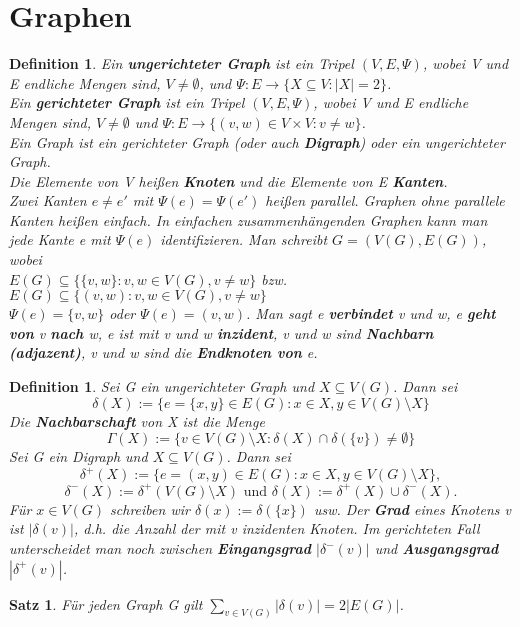 \documentclass[12pt,a4paper]{article}
\theoremstyle{plain}
\newtheorem{Satz}[Theorem]{Satz}
\newtheorem{Definition}[Theorem]{Definition}
\newcommand{\herv}[1]{{\emph{\textbf{#1}}}}
\numberwithin{equation}{section}
\begin{document}
\section{Graphen}
\begin{Definition}
Ein \herv{ungerichteter Graph} ist ein Tripel $(V,E,\Psi)$, wobei V und E endliche Mengen sind, $V\neq\emptyset$, und $\Psi:E\rightarrow\{X\subseteq V:|X|=2\}$.\\
Ein \herv{gerichteter Graph} ist ein Tripel $(V,E,\Psi)$, wobei V und E endliche Mengen sind, $V\neq \emptyset$ und $\Psi: E\rightarrow\{(v,w)\in V\times V: v\neq w\}$.\\
Ein Graph ist ein gerichteter Graph (oder auch \herv{Digraph}) oder ein ungerichteter Graph. \\
Die Elemente von V heißen \herv{Knoten} und die Elemente von E \herv{Kanten}. \\
Zwei Kanten $e\neq e'$ mit $\Psi(e)=\Psi(e')$ heißen parallel. Graphen ohne parallele Kanten heißen einfach. In einfachen zusammenhängenden Graphen kann man jede Kante e mit $\Psi(e)$ identifizieren. Man schreibt $G=(V(G),E(G))$, wobei \\
$E(G)\subseteq\{\{v,w\}:v,w\in V(G), v\neq w\}$ bzw. $E(G)\subseteq\{(v,w):v,w\in V(G),v\neq w \}$\\
$\Psi(e)=\{v,w\}$ oder $\Psi(e)=(v,w)$. Man sagt e \herv{verbindet} v und w, e \herv{geht von} v \herv{nach} w, e ist mit v und w \herv{inzident}, v und w sind \herv{Nachbarn (adjazent)}, v und w sind die \herv{Endknoten von} e.
\end{Definition}
\begin{Definition}
Sei G ein ungerichteter Graph und $X\subseteq V(G)$. Dann sei 
\[ \delta(X):=\{e=\{x,y\}\in E(G): x\in X, y \in V(G)\setminus X\} \]
Die \herv{Nachbarschaft} von X ist die Menge
\[ \Gamma(X):=\{v\in V(G)\setminus X: \delta(X) \cap \delta(\{v\})\neq \emptyset \} \]
Sei G ein Digraph und $X\subseteq V(G)$. Dann sei
\[ \delta^+(X):=\{e=(x,y)\in E(G): x\in X, y \in V(G)\setminus X\}, \]
\[ \delta^-(X):=\delta^+(V(G)\setminus X)\text{ und } \delta(X):=\delta^+(X)\cup \delta^-(X). \]
Für $x \in V(G)$ schreiben wir $\delta(x):=\delta(\{x\})$ usw. Der \herv{Grad} eines Knotens v ist $|\delta(v)|$, d.h. die Anzahl der mit v inzidenten Knoten. Im gerichteten Fall unterscheidet man noch zwischen \herv{Eingangsgrad} $|\delta^-(v)|$ und \herv{Ausgangsgrad} $|\delta^+(v)|$.
\end{Definition}
\begin{Satz}
Für jeden Graph G gilt $\sum_{v\in V(G)}{|\delta(v)|}=2|E(G)|$.
\end{Satz}
\end{document}
